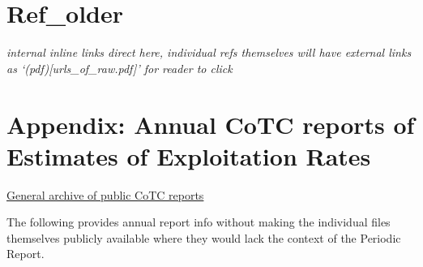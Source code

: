\documentclass[
  letterpaper,
  DIV=11,
  numbers=noendperiod]{scrartcl}
\begin{document}
\section{Ref\_older}\label{sec-refs}

\emph{internal inline links direct here, individual refs themselves will
have external links as `(pdf){[}urls\_of\_raw.pdf{]}' for reader to
click}

\section{Appendix: Annual CoTC reports of Estimates of Exploitation
Rates}\label{appendix-annual-cotc-reports-of-estimates-of-exploitation-rates}

\href{https://www.psc.org/publications/technical-reports/technical-committee-reports/coho/}{General
archive of public CoTC reports}

The following provides annual report info without making the individual
files themselves publicly available where they would lack the context of
the Periodic Report.
\end{document}
